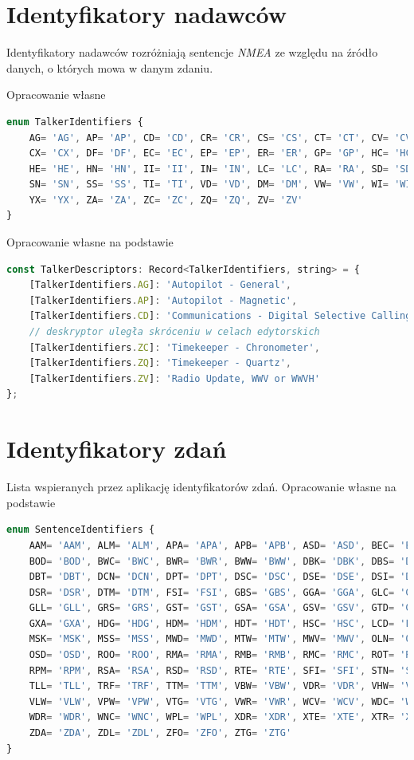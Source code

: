 \documentclass[skorowidz,skroty]{dyplomWEZUT}
\begin{document}
\section{Identyfikatory nadawców}\label{sec:talker ids}
Identyfikatory nadawców rozróżniają sentencje \textit{NMEA} ze względu na źródło danych, o których mowa w danym zdaniu.

{Opracowanie własne \cite{gpsinformation, Raymond2019}}{\label{code:Talkers enum}}
\begin{lstlisting}[language=JavaScript]
enum TalkerIdentifiers {
    AG= 'AG', AP= 'AP', CD= 'CD', CR= 'CR', CS= 'CS', CT= 'CT', CV= 'CV',
    CX= 'CX', DF= 'DF', EC= 'EC', EP= 'EP', ER= 'ER', GP= 'GP', HC= 'HC',
    HE= 'HE', HN= 'HN', II= 'II', IN= 'IN', LC= 'LC', RA= 'RA', SD= 'SD',
    SN= 'SN', SS= 'SS', TI= 'TI', VD= 'VD', DM= 'DM', VW= 'VW', WI= 'WI',
    YX= 'YX', ZA= 'ZA', ZC= 'ZC', ZQ= 'ZQ', ZV= 'ZV'
}
\end{lstlisting}

{Opracowanie własne na podstawie \cite{gpsinformation, Raymond2019}}{\label{code: talkers descriptors}}
\begin{lstlisting}[language=JavaScript]
const TalkerDescriptors: Record<TalkerIdentifiers, string> = {
    [TalkerIdentifiers.AG]: 'Autopilot - General',
    [TalkerIdentifiers.AP]: 'Autopilot - Magnetic',
    [TalkerIdentifiers.CD]: 'Communications - Digital Selective Calling (DSC)',
    // deskryptor uległa skróceniu w celach edytorskich
    [TalkerIdentifiers.ZC]: 'Timekeeper - Chronometer',
    [TalkerIdentifiers.ZQ]: 'Timekeeper - Quartz',
    [TalkerIdentifiers.ZV]: 'Radio Update, WWV or WWVH'
};
\end{lstlisting}

\section{Identyfikatory zdań}\label{sec:sentence ids}
Lista wspieranych przez aplikację identyfikatorów zdań.
{Opracowanie własne na podstawie \cite{gpsinformation, Raymond2019}}{\label{code:Sentences enum}}
\begin{lstlisting}[language=JavaScript]
enum SentenceIdentifiers {
    AAM= 'AAM', ALM= 'ALM', APA= 'APA', APB= 'APB', ASD= 'ASD', BEC= 'BEC',
    BOD= 'BOD', BWC= 'BWC', BWR= 'BWR', BWW= 'BWW', DBK= 'DBK', DBS= 'DBS',
    DBT= 'DBT', DCN= 'DCN', DPT= 'DPT', DSC= 'DSC', DSE= 'DSE', DSI= 'DSI',
    DSR= 'DSR', DTM= 'DTM', FSI= 'FSI', GBS= 'GBS', GGA= 'GGA', GLC= 'GLC',
    GLL= 'GLL', GRS= 'GRS', GST= 'GST', GSA= 'GSA', GSV= 'GSV', GTD= 'GTD',
    GXA= 'GXA', HDG= 'HDG', HDM= 'HDM', HDT= 'HDT', HSC= 'HSC', LCD= 'LCD',
    MSK= 'MSK', MSS= 'MSS', MWD= 'MWD', MTW= 'MTW', MWV= 'MWV', OLN= 'OLN',
    OSD= 'OSD', ROO= 'ROO', RMA= 'RMA', RMB= 'RMB', RMC= 'RMC', ROT= 'ROT',
    RPM= 'RPM', RSA= 'RSA', RSD= 'RSD', RTE= 'RTE', SFI= 'SFI', STN= 'STN',
    TLL= 'TLL', TRF= 'TRF', TTM= 'TTM', VBW= 'VBW', VDR= 'VDR', VHW= 'VHW',
    VLW= 'VLW', VPW= 'VPW', VTG= 'VTG', VWR= 'VWR', WCV= 'WCV', WDC= 'WDC',
    WDR= 'WDR', WNC= 'WNC', WPL= 'WPL', XDR= 'XDR', XTE= 'XTE', XTR= 'XTR',
    ZDA= 'ZDA', ZDL= 'ZDL', ZFO= 'ZFO', ZTG= 'ZTG'
}
\end{lstlisting}
\end{document}
